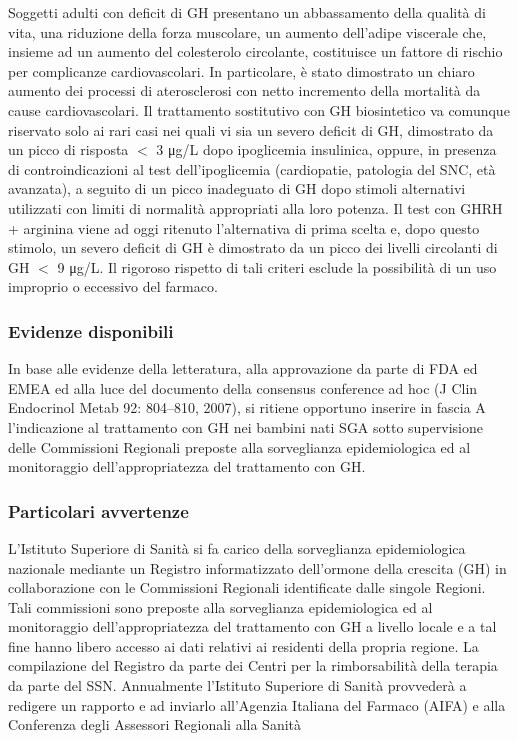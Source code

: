 Soggetti adulti con deficit di GH presentano un abbassamento della qualit\`a di vita, una riduzione della forza
muscolare, un aumento dell'adipe viscerale che, insieme ad un aumento del colesterolo circolante, costituisce
un fattore di rischio per complicanze cardiovascolari. In particolare, \`e stato dimostrato un chiaro aumento dei
processi di aterosclerosi con netto incremento della mortalit\`a da cause cardiovascolari. Il trattamento
sostitutivo con GH biosintetico va comunque riservato solo ai rari casi nei quali vi sia un severo deficit di GH,
dimostrato da un picco di risposta $<$ 3  \unit{\micro g}/L dopo ipoglicemia insulinica, oppure, in presenza di
controindicazioni al test dell'ipoglicemia (cardiopatie, patologia del SNC, et\`a avanzata), a seguito di un picco
inadeguato di GH dopo stimoli alternativi utilizzati con limiti di normalit\`a appropriati alla loro potenza. Il test
con GHRH + arginina viene ad oggi ritenuto l'alternativa di prima scelta e, dopo questo stimolo, un severo
deficit di GH \`e dimostrato da un picco dei livelli circolanti di GH $<$ 9 \unit{\micro g}/L. Il rigoroso rispetto di tali criteri
esclude la possibilit\`a di un uso improprio o eccessivo del farmaco.

\subsubsection*{Evidenze disponibili}

In base alle evidenze della letteratura, alla approvazione da parte di FDA ed EMEA ed alla luce del documento
della consensus conference ad hoc (J Clin Endocrinol Metab 92: 804–810, 2007), si ritiene opportuno inserire
in fascia A l'indicazione al trattamento con GH nei bambini nati SGA sotto supervisione delle Commissioni
Regionali preposte alla sorveglianza epidemiologica ed al monitoraggio dell'appropriatezza del trattamento
con GH.

\subsubsection*{Particolari avvertenze}

L'Istituto Superiore di Sanit\`a si fa carico della sorveglianza epidemiologica nazionale mediante un Registro
informatizzato dell'ormone della crescita (GH) in collaborazione con le Commissioni Regionali identificate
dalle singole Regioni. Tali commissioni sono preposte alla sorveglianza epidemiologica ed al monitoraggio
dell'appropriatezza del trattamento con GH a livello locale e a tal fine hanno libero accesso ai dati relativi ai
residenti della propria regione. La compilazione del Registro da parte dei Centri per la rimborsabilit\`a della
terapia da parte del SSN. Annualmente l'Istituto Superiore di Sanit\`a provveder\`a a redigere un rapporto e ad
inviarlo all'Agenzia Italiana del Farmaco (AIFA) e alla Conferenza degli Assessori Regionali alla Sanit\`a

